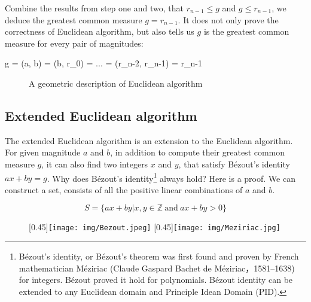\documentclass[b5paper]{article}
\begin{document}
Combine the results from step one and two, that $r_{n-1} \leq g$ and $g \leq r_{n-1}$, we deduce the greatest common measure $g = r_{n-1}$. It does not only prove the correctness of Euclidean algorithm, but also tells us $g$ is the greatest common measure for every pair of magnitudes:

\be
g = \gcm(a, b) = \gcm(b, r_0) = ... = \gcm(r_{n-2}, r_{n-1}) = r_{n-1}
\label{eq:recursive-gcm}
\ee

\begin{figure}[htbp]
 \centering
 \captionsetup{labelformat=empty}
 \caption{A geometric description of Euclidean algorithm}
 \label{fig:geometric-GCM}
\end{figure}

\subsection{Extended Euclidean algorithm}

The extended Euclidean algorithm is an extension to the Euclidean algorithm. For given magnitude $a$ and $b$, in addition to compute their greatest common measure $g$, it can also find two integers $x$ and $y$, that satisfy Bézout's identity $ax + by = g$. Why does Bézout's identity\footnote{Bézout's identity, or Bézout's theorem was first found and proven by French mathematician Méziriac (Claude Gaspard Bachet de Méziriac，1581–1638) for integers. Bézout proved it hold for polynomials. Bézout identity can be extended to any Euclidean domain and Principle Idean Domain (PID).} always hold? Here is a proof. We can construct a set, consists of all the positive linear combinations of $a$ and $b$.

\[
S = \{ ax + by | x, y \in \mathbb{Z}\ \text{and} \ ax + by > 0\}
\]

\begin{figure}[htbp]
 \centering
 [0.45\linewidth]{\texttt{[image: img/Bezout.jpeg]}}
 [0.45\linewidth]{\texttt{[image: img/Meziriac.jpg]}}
 \captionsetup{labelformat=empty}
 \caption{}
 \label{fig:Bezout}
 \label{fig:Meziriac}
\end{figure}
\end{document}
